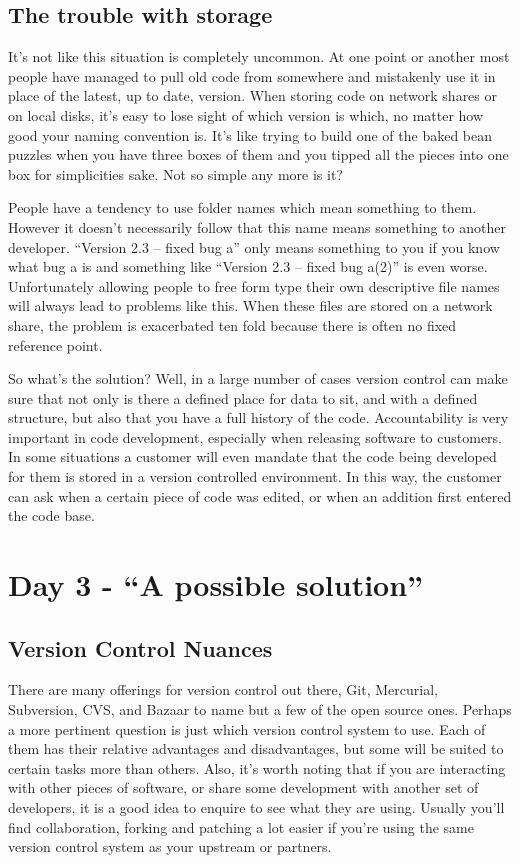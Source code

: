 \subsection{The trouble with storage}
It's not like this situation is completely uncommon.
At one point or another most people have managed to pull old code from somewhere and mistakenly use it in place of the latest, up to date, version.
When storing code on network shares or on local disks, it's easy to lose sight of which version is which, no matter how good your naming convention is.
It's like trying to build one of the baked bean puzzles when you have three boxes of them and you tipped all the pieces into one box for simplicities sake.
Not so simple any more is it?

People have a tendency to use folder names which mean something to them.
However it doesn't necessarily follow that this name means something to another developer.
``Version 2.3 -- fixed bug a'' only means something to you if you know what bug a is and something like ``Version 2.3 -- fixed bug a(2)'' is even worse.
Unfortunately allowing people to free form type their own descriptive file names will always lead to problems like this.
When these files are stored on a network share, the problem is exacerbated ten fold because there is often no fixed reference point.

So what's the solution? Well, in a large number of cases version control can make sure that not only is there a defined place for data to sit, and with a defined structure, but also that you have a full history of the code.
Accountability is very important in code development, especially when releasing software to customers.
In some situations a customer will even mandate that the code being developed for them is stored in a version controlled environment.
In this way, the customer can ask when a certain piece of code was edited, or when an addition first entered the code base.

\section{Day 3 - ``A possible solution''}
\subsection{Version Control Nuances}
There are many offerings for version control out there, Git, Mercurial, Subversion, CVS, and Bazaar to name but a few of the open source ones.
Perhaps a more pertinent question is just which version control system to use.
Each of them has their relative advantages and disadvantages, but some will be suited to certain tasks more than others.
Also, it's worth noting that if you are interacting with other pieces of software, or share some development with another set of developers, it is a good idea to enquire to see what they are using.
Usually you'll find collaboration, forking and patching a lot easier if you're using the same version control system as your upstream or partners.

